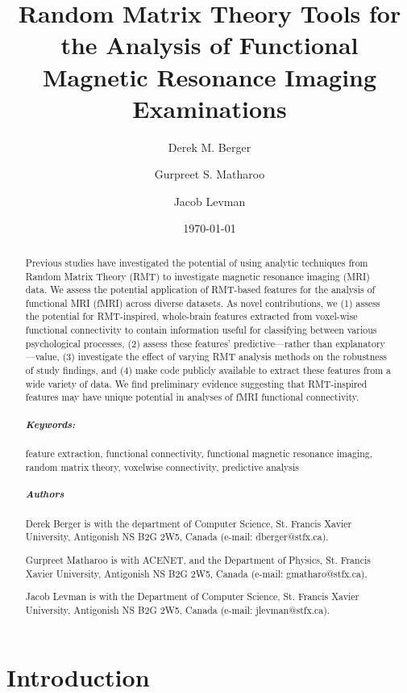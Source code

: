 

\title{Random Matrix Theory Tools for the Analysis of Functional Magnetic Resonance Imaging Examinations}
\author{Derek M. Berger \and Gurpreet S. Matharoo \and Jacob Levman}
\date{\today}


\maketitle


\begin{abstract}
    Previous studies have investigated the potential of using analytic techniques from Random Matrix
    Theory (RMT) to investigate magnetic resonance imaging (MRI) data. We assess the potential
    application of RMT-based features for the analysis of functional MRI (fMRI) across diverse
    datasets. As novel contributions, we (1) assess the potential for RMT-inspired, whole-brain
    features extracted from voxel-wise functional connectivity to contain information useful for
    classifying between various psychological processes, (2) assess these features’
    predictive—rather than explanatory—value, (3) investigate the effect of varying RMT analysis
    methods on the robustness of study findings, and (4) make code publicly available to extract
    these features from a wide variety of data. We find preliminary evidence suggesting that
    RMT-inspired features may have unique potential in analyses of fMRI functional connectivity.

    \subparagraph{Keywords:} feature extraction, functional connectivity, functional magnetic
    resonance imaging, random matrix theory, voxelwise connectivity, predictive analysis

    \subparagraph{Authors}
    Derek Berger is with the department of Computer Science, St. Francis Xavier University, Antigonish
    NS B2G 2W5, Canada (e-mail: dberger@stfx.ca).

    Gurpreet Matharoo is with ACENET, and the Department of Physics, St. Francis Xavier University,
    Antigonish NS B2G 2W5, Canada (e-mail: gmatharo@stfx.ca).

    Jacob Levman is with the Department of Computer Science, St. Francis Xavier University,
    Antigonish NS B2G 2W5, Canada (e-mail: jlevman@stfx.ca).
\end{abstract}


\section{Introduction}

